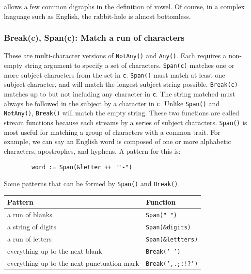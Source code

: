 \documentclass[letterpaper,12pt]{article}
\begin{document}
\noindent
allows a few common digraphs in the definition of vowel.  Of course, in
a complex language such as English, the rabbit-hole is almost bottomless.


\subsubsection{Break(c), Span(c): Match a run of characters}

These are multi-character versions of {\tt NotAny()} and {\tt Any()}.
Each requires a non-empty string argument to specify a set of characters.
{\tt Span(c)} matches one or more subject characters from the set in {\tt c}.
{\tt Span()} must
match at least one subject character, and will match the longest
subject string possible.  {\tt Break(c)} matches up to but not including
any character in {\tt c}. The string matched must always be followed in the
subject by a character in {\tt c}. Unlike {\tt Span()} and {\tt NotAny()},
{\tt Break()}
will match the empty string.  These two functions are called stream
functions because each streams by a series of subject
characters. {\tt Span()} is most useful for matching a group of characters
with a common trait. For example, we can say an English word is
composed of one or more alphabetic characters, apostrophes, and
hyphens. A pattern for this is:

\begin{verbatim}
        word := Span(&letter ++ "'-")
\end{verbatim}

Some patterns that can be formed by {\tt Span()} and {\tt Break()}.
\begin{table}[h]
\begin{center}
{\begin{tabular}{ | l | l | } \hline 
        Pattern & Function \\ \hline
        a run of blanks & {\tt Span(" ")} \\ \hline
	a string of digits & {\tt Span(\&digits)} \\ \hline
	a run of letters & {\tt Span(\&lettters)} \\ \hline
	everything up to the next blank & {\tt Break(' ')} \\ \hline
	everything up to the next punctuation mark & {\tt Break(',.;:!?')} \\ \hline
\end{tabular}}
\end{center}
\end{table}
\end{document}
